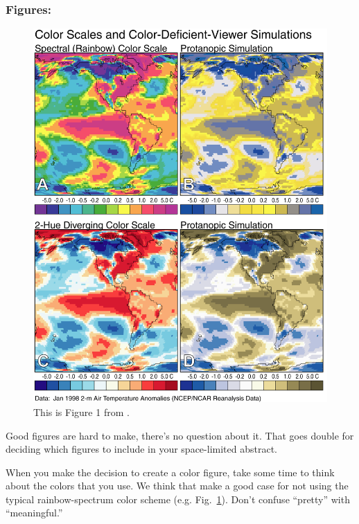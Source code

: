 \documentclass[twoside]{article}
\begin{document}
\subsubsection*{\hspace{0.5cm}Figures:}

\begin{figure}[b]
\begin{center}
\includegraphics[width=\columnwidth]{lb_fig1.png}
\caption{ \label{color_scales}
    This is Figure 1 from \citep{light2004end}. 
    }
\end{center}
\end{figure}

Good figures are hard to make, there's no question about it.
That goes double for deciding which figures to include in your space-limited abstract.

When you make the decision to create a color figure, take some time to think about the colors that you use.
We think that \citep{light2004end, borland2007rainbow} make a good case for not using the typical rainbow-spectrum color scheme (e.g. Fig.~\ref{color_scales}).
Don't confuse ``pretty'' with ``meaningful.''
\end{document}
